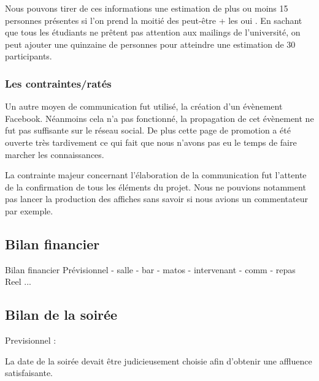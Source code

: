 Nous pouvons tirer de ces informations une estimation de plus ou moins 15 personnes présentes si l’on prend
la moitié des \og peut-être \fg{} + les \og oui \fg{}.
En sachant que tous les étudiants ne prêtent pas attention aux mailings de l’université, on peut ajouter
une quinzaine de personnes pour atteindre une estimation de 30 participants.
\subsubsection{Les contraintes/ratés}%
\label{ssub:les_contraintes_rates}

Un autre moyen de communication fut utilisé, la création d'un évènement
Facebook. Néanmoins cela n'a pas fonctionné, la propagation de cet
évènement ne fut pas suffisante sur le réseau social. De plus cette page
de promotion a été ouverte très tardivement ce qui fait que  nous
n'avons pas eu le temps de faire marcher les connaissances.

La contrainte majeur concernant l'élaboration de la communication fut l'attente
de la confirmation de tous les éléments du projet.  Nous ne pouvions
notamment pas lancer la production des affiches sans savoir si nous
avions un commentateur par exemple.

\subsection{Bilan financier}%
\label{sub:bilan_financier}

Bilan financier
        Prévisionnel
            - salle
            - bar
            - matos
            - intervenant
            - comm
            - repas
        Reel
           ...

\subsection{Bilan de la soirée}%
\label{sub:Bilan_de_la_soiree}

Previsionnel :

La date de la soirée devait être judicieusement choisie afin d'obtenir une affluence satisfaisante.

